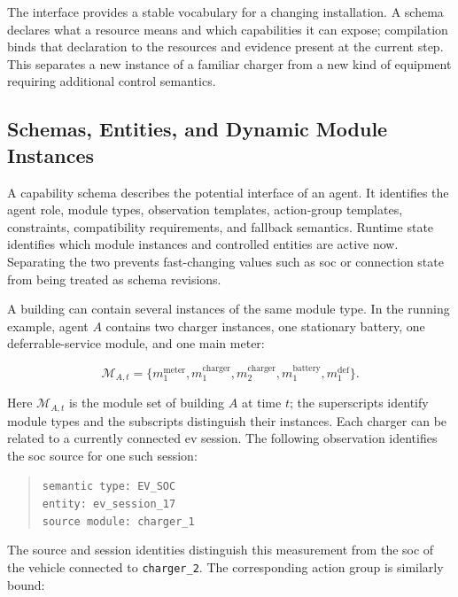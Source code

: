 The interface provides a stable vocabulary for a changing installation. A schema declares what a resource means and which capabilities it can expose; compilation binds that declaration to the resources and evidence present at the current step. This separates a new instance of a familiar charger from a new kind of equipment requiring additional control semantics.

\subsection{Schemas, Entities, and Dynamic Module Instances}
\label{sec:timarl-entities}

A capability schema describes the potential interface of an agent. It identifies the agent role, module types, observation templates, action-group templates, constraints, compatibility requirements, and fallback semantics. Runtime state identifies which module instances and controlled entities are active now. Separating the two prevents fast-changing values such as \gls{soc} or connection state from being treated as schema revisions.

A building can contain several instances of the same module type. In the running example, agent $A$ contains two charger instances, one stationary battery, one deferrable-service module, and one main meter:

\begin{equation}
\mathcal{M}_{A,t}
=
\{m^{\mathrm{meter}}_1,
  m^{\mathrm{charger}}_1,
  m^{\mathrm{charger}}_2,
  m^{\mathrm{battery}}_1,
  m^{\mathrm{def}}_1\}.
\label{eq:running-modules}
\end{equation}

Here $\mathcal M_{A,t}$ is the module set of building $A$ at time $t$; the superscripts identify module types and the subscripts distinguish their instances. Each charger can be related to a currently connected \gls{ev} session. The following observation identifies the \gls{soc} source for one such session:

\begin{quote}\small
\begin{minipage}{\linewidth}
\texttt{semantic type: EV\_SOC}\\
\texttt{entity: ev\_session\_17}\\
\texttt{source module: charger\_1}
\end{minipage}
\end{quote}

The source and session identities distinguish this measurement from the \gls{soc} of the vehicle connected to \texttt{charger\_2}. The corresponding action group is similarly bound:

